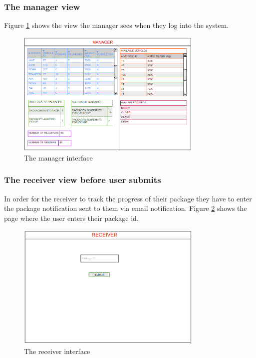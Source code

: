 \documentclass[paper=a4, fontsize=11pt]{scrartcl} %
\numberwithin{equation}{section} %
\numberwithin{figure}{section} %
\numberwithin{table}{section} %
\begin{document}
\subsubsection{The manager view}
Figure \ref{Manager} shows the view the manager sees when they log into the system. 
\begin{figure}[h!]
\centering
\includegraphics[width=3.5in]{pictures/manager.png}
\caption{The manager interface}
\label{Manager}
\end{figure}


\subsubsection{The receiver view before user submits}
In order for the receiver to track the progress of their package they have to enter the package notification sent to them via email notification. Figure \ref{ReceiverBefore} shows the page where the user enters their package id.
\begin{figure}[h!]
\centering
\includegraphics[width=3.5in]{pictures/receiverBefore.png}
\caption{The receiver interface}
\label{ReceiverBefore}
\end{figure}
\end{document}
